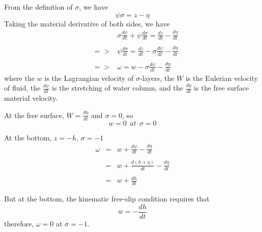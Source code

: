\documentclass[oribibl]{llncs}
\begin{document}
From the definition of $\sigma$, we have
\begin{equation}  
\psi\sigma=z-\eta
\end{equation}  
Taking the material derivative of both sides, we have 
\begin{eqnarray}  
&&\sigma \frac{d \psi}{d t} + \psi\frac{d \sigma}{dt} = \frac{d z}{d t} -\frac{d \eta}{d t}  \nonumber \\ \nonumber \\ 
&=>& \psi\frac{d \sigma}{dt} = \frac{d z}{d t} - \sigma \frac{d \psi}{d t} -\frac{d \eta}{d t}   \nonumber \\ \nonumber \\ 
&=>& \omega = w- \sigma \frac{d \psi}{d t} -\frac{d \eta}{d t}  
\end{eqnarray}  
where the $w$ is  the Lagrangian velocity of $\sigma$-layers, the $W$ is the Eulerian velocity of fluid, the $\frac{d \psi}{d t}$ is the stretching of water column, and the $\frac{d \eta}{d t} $ is the free surface material velocity.

At the free surface, $W=\frac{d \eta}{dt}$ and $\sigma=0$, so
\begin{equation}  
w = 0 \ \ at \ \ \sigma = 0
\end{equation}  

At the bottom, $z=-h$, $\sigma=-1$
\begin{eqnarray}  
\omega &=& w+ \frac{d \psi}{d t} -\frac{d \eta}{d t}  \nonumber \\ \nonumber \\ 
&=& w+ \frac{d (h+\eta)}{d t} -\frac{d \eta}{d t}  \nonumber \\ \nonumber \\ 
&=& w+ \frac{d h}{d t} 
\end{eqnarray}  

But at the bottom, the kinematic free-slip condition requires that
\begin{equation}  
w = - \frac{d h}{d t} 
\end{equation}  
therefore, $\omega=0$ at $\sigma=-1$.
\end{document}

